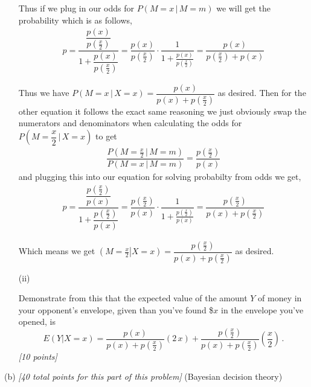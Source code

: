 \documentclass[12pt]{article}
\newcommand{\given}{\, | \,}
\begin{document}
\begin{itemize}
Thus if we plug in our odds for $P(M=x\given M = m)$ we will get the probability which is as follows,
\begin{align*}
    p = \dfrac{\dfrac{p(x)}{p(\frac{x}{2})}}{1 + \dfrac{p(x)}{p(\frac{x}{2})}} = \dfrac{p(x)}{p(\frac{x}{2})} \cdot \dfrac{1}{1+\frac{p(x)}{p(\frac{x}{2})}} = \dfrac{p(x)}{p(\frac{x}{2})+p(x)}
\end{align*}

Thus we have $P(M = x\given X =x) = \dfrac{ p ( x ) }{ p ( x ) + p \! \left( \frac{ x }{
    2 } \right) }$ as desired. Then for the other equation it follows the exact same reasoning we just obviously swap the numerators and denominators when calculating the odds for $P(M = \dfrac{x}{2} \given X =x)$ to get 
\begin{align*}
    \dfrac{P(M = \frac{x}{2} \given M = m)}{P(M = x \given M = m)} = \dfrac{p(\frac{x}{2})}{p(x)}
\end{align*}
and plugging this into our equation for solving probabilty from odds we get,
\begin{align*}
    p = \dfrac{\dfrac{p(\frac{x}{2})}{p(x)}}{1+ \dfrac{p(\frac{x}{2})}{p(x)}} = \dfrac{p(\frac{x}{2})}{p(x)} \cdot \dfrac{1}{1+ \frac{p(\frac{x}{2})}{p(x)}} = \dfrac{ p \! \left( \frac{ x }{ 2 } \right) }{ p
    ( x ) + p \! \left( \frac{ x }{ 2 } \right) }
\end{align*}

Which means we get $\left( M = \left. \frac{ x }{ 2} \right| X = x \right) = \dfrac{ p \! \left( \frac{ x }{ 2 } \right) }{ p( x ) + p \! \left( \frac{ x }{ 2 } \right) } $ as desired. 

\item[(ii)]

Demonstrate from this that the expected value of the amount $Y$ of money
in your opponent's envelope, given than you've found \$$x$ in the envelope
you've opened, is
\begin{equation} \label{e:calculation-2}
E ( Y | X = x ) = \frac{ p ( x ) }{ p ( x ) + p \! \left( \frac{ x }{ 2 }
\right) } ( 2 \, x ) + \frac{ p \! \left( \frac{ x }{ 2 } \right) }{ p ( x ) + p \! \left( \frac{ x }{ 2 } \right) } \left( \frac{ x }{ 2 } \right) \, .
\end{equation}
\textit{[10 points]}

\end{itemize}

(b) \textit{[40 total points for this part of this problem]} (Bayesian decision theory)
\end{document}
